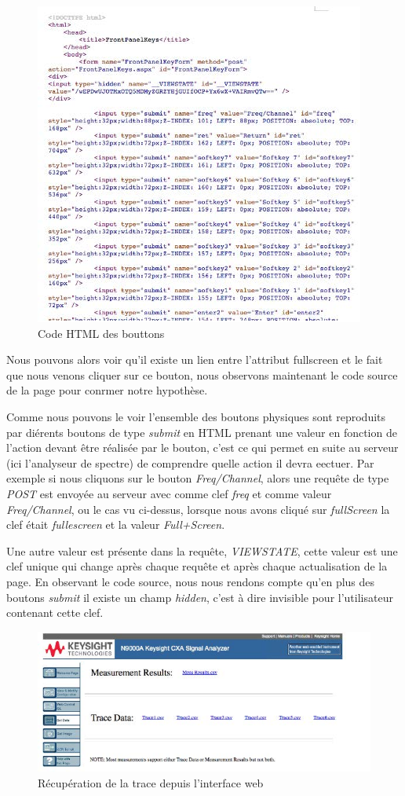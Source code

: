             \begin{figure}[ht]
                \centering
                \includegraphics[width=0.5\linewidth]{images/spa/AS_buttons_html}
                \caption{Code HTML des bouttons}
                \label{fig:AS_buttons_html}
            \end{figure}

        Nous pouvons alors voir qu'il existe un lien entre l'attribut  fullscreen  et le fait que nous venons cliquer sur ce
            bouton, nous observons maintenant le code source de la page pour conrmer notre hypothèse.

        Comme nous pouvons le voir l'ensemble des boutons physiques sont reproduits par diérents boutons de type \textit{submit}
            en HTML prenant une valeur en fonction de l'action devant être réalisée par le bouton, c'est ce qui permet en suite au
            serveur (ici l'analyseur de spectre) de comprendre quelle action il devra eectuer. Par exemple si nous cliquons sur le
            bouton \textit{Freq/Channel}, alors une requête de type \textit{POST} est envoyée au serveur avec comme clef \textit{freq} et comme
            valeur \textit{Freq/Channel}, ou le cas vu ci-dessus, lorsque nous avons cliqué sur \textit{fullScreen} la clef était \textit{fullescreen} et
            la valeur \textit{Full+Screen}.

        Une autre valeur est présente dans la requête, \textit{VIEWSTATE}, cette valeur est une clef unique qui change après
            chaque requête et après chaque actualisation de la page. En observant le code source, nous nous rendons compte qu'en
            plus des boutons \textit{submit} il existe un champ \textit{hidden}, c'est à dire invisible pour l'utilisateur contenant cette clef.

            \begin{figure}[ht]
                \centering
                \includegraphics[width=0.5\linewidth]{images/spa/AS_recuperation_trace}
                \caption{Récupération de la trace depuis l'interface web}
                \label{fig:AS_recuperation_trace}
            \end{figure}


